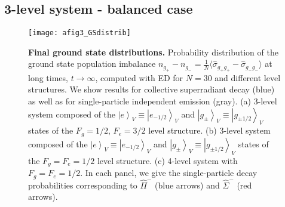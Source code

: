 \documentclass[aps,prx,superscriptaddress,twocolumn,notitlepage,nofootinbib,longbibliography]{revtex4-2}
\newcommand{\ket}[1]{\left|#1\right>}
\begin{document}

\subsection{3-level system - balanced case}

\begin{figure}[!t]
\centering
\texttt{[image: afig3\_GSdistrib]}
\caption{\textbf{Final ground state distributions.} Probability distribution of the ground state population imbalance $n_{g_+}-n_{g_-}=\frac{1}{N}\langle \hat{\sigma}_{g_+g_+}-\hat{\sigma}_{g_-g_-}\rangle$ at long times, $t\rightarrow\infty$, computed with ED for $N=30$ and different level structures. We show results for collective superradiant decay (blue) as well as for single-particle independent emission (gray). (a) 3-level system composed of the $\ket{e}_V\equiv \ket{e_{-1/2}}_V$ and $\ket{g_{\pm}}_V\equiv \ket{g_{\pm1/2}}_V$ states of the $F_g=1/2$, $F_e=3/2$ level structure. (b) 3-level system composed of the $\ket{e}_V\equiv \ket{e_{-1/2}}_V$ and $\ket{g_{\pm}}_V\equiv \ket{g_{\pm1/2}}_V$ states of the $F_g=F_e=1/2$ level structure. (c) 4-level system with $F_g=F_e=1/2$. In each panel, we give the single-particle decay probabilities corresponding to $\hat{\Pi}^-$ (blue arrows) and $\hat{\Sigma}^-$ (red arrows).}
\label{fig:app_GSdistrib}
\end{figure}
\end{document}

